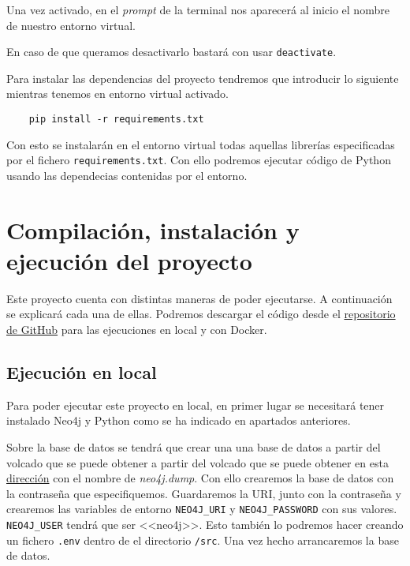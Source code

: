 Una vez activado, en el \textit{prompt} de la terminal nos aparecerá al inicio el nombre de nuestro entorno virtual.

En caso de que queramos desactivarlo bastará con usar \texttt{deactivate}.

Para instalar las dependencias del proyecto tendremos que introducir lo siguiente mientras tenemos en entorno virtual activado.

\begin{verbatim}
	pip install -r requirements.txt
\end{verbatim}

Con esto se instalarán en el entorno virtual todas aquellas librerías especificadas por el fichero \texttt{requirements.txt}. Con ello podremos ejecutar código de Python usando las dependecias contenidas por el entorno.

\label{sec:compilación}
\section{Compilación, instalación y ejecución del proyecto}
Este proyecto cuenta con distintas maneras de poder ejecutarse. A continuación se explicará cada una de ellas. Podremos descargar el código desde el \href{https://github.com/mariohu2001/TFG-Urban-Street-Mapping-Transfer}{repositorio de GitHub} para las ejecuciones en local y con Docker.
\subsection{Ejecución en local}
Para poder ejecutar este proyecto en local, en primer lugar se necesitará tener instalado Neo4j y Python como se ha indicado en apartados anteriores.

Sobre la base de datos se tendrá que crear una una base de datos a partir del volcado que se puede obtener a partir del volcado que se puede obtener en esta \href{https://universidaddeburgos-my.sharepoint.com/:f:/g/personal/mhu1001_alu_ubu_es/Evm-45Fq9y1Ps-F3_PGd5KsBNR3G0JAR2-t1IrXBDm2BEQ?e=rQP1ls}{dirección} con el nombre de \textit{neo4j.dump}. Con ello crearemos la base de datos con la contraseña que especifiquemos. Guardaremos la URI, junto con la contraseña y crearemos las variables de entorno \texttt{NEO4J\_URI} y \texttt{NEO4J\_PASSWORD} con sus valores. \texttt{NEO4J\_USER} tendrá que ser <<neo4j>>. Esto también lo podremos hacer creando un fichero \texttt{.env} dentro de el directorio \texttt{/src}. Una vez hecho arrancaremos la base de datos.

